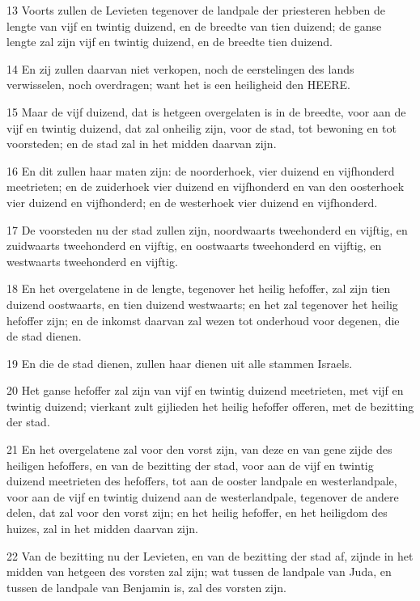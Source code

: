 \par 13 Voorts zullen de Levieten tegenover de landpale der priesteren hebben de lengte van vijf en twintig duizend, en de breedte van tien duizend; de ganse lengte zal zijn vijf en twintig duizend, en de breedte tien duizend.
\par 14 En zij zullen daarvan niet verkopen, noch de eerstelingen des lands verwisselen, noch overdragen; want het is een heiligheid den HEERE.
\par 15 Maar de vijf duizend, dat is hetgeen overgelaten is in de breedte, voor aan de vijf en twintig duizend, dat zal onheilig zijn, voor de stad, tot bewoning en tot voorsteden; en de stad zal in het midden daarvan zijn.
\par 16 En dit zullen haar maten zijn: de noorderhoek, vier duizend en vijfhonderd meetrieten; en de zuiderhoek vier duizend en vijfhonderd en van den oosterhoek vier duizend en vijfhonderd; en de westerhoek vier duizend en vijfhonderd.
\par 17 De voorsteden nu der stad zullen zijn, noordwaarts tweehonderd en vijftig, en zuidwaarts tweehonderd en vijftig, en oostwaarts tweehonderd en vijftig, en westwaarts tweehonderd en vijftig.
\par 18 En het overgelatene in de lengte, tegenover het heilig hefoffer, zal zijn tien duizend oostwaarts, en tien duizend westwaarts; en het zal tegenover het heilig hefoffer zijn; en de inkomst daarvan zal wezen tot onderhoud voor degenen, die de stad dienen.
\par 19 En die de stad dienen, zullen haar dienen uit alle stammen Israels.
\par 20 Het ganse hefoffer zal zijn van vijf en twintig duizend meetrieten, met vijf en twintig duizend; vierkant zult gijlieden het heilig hefoffer offeren, met de bezitting der stad.
\par 21 En het overgelatene zal voor den vorst zijn, van deze en van gene zijde des heiligen hefoffers, en van de bezitting der stad, voor aan de vijf en twintig duizend meetrieten des hefoffers, tot aan de ooster landpale en westerlandpale, voor aan de vijf en twintig duizend aan de westerlandpale, tegenover de andere delen, dat zal voor den vorst zijn; en het heilig hefoffer, en het heiligdom des huizes, zal in het midden daarvan zijn.
\par 22 Van de bezitting nu der Levieten, en van de bezitting der stad af, zijnde in het midden van hetgeen des vorsten zal zijn; wat tussen de landpale van Juda, en tussen de landpale van Benjamin is, zal des vorsten zijn.
